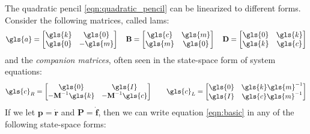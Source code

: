 \section{}
\label{sec:SPT}
The quadratic pencil \eqref{eqn:quadratic_pencil} can be linearized to different forms.
Consider the following matrices, called \glspl{lam}:
\begin{equation}
	\label{eqn:lam}
	\gls{a} = \begin{bmatrix}
	\gls{k} & \gls{0}\\
	\gls{0} & -\gls{m}
	\end{bmatrix} 
	\quad\mathbf{B} = \begin{bmatrix}
	\gls{c} & \gls{m}\\
	\gls{m} & \gls{0}
	\end{bmatrix}  
	\quad\mathbf{D} = \begin{bmatrix}
	\gls{0} & \gls{k}\\
	\gls{k} & \gls{c}
	\end{bmatrix}
\end{equation}
and the \emph{companion matrices}, often seen in the state-space form of system equations:
\begin{equation}
	\gls{c}_R = \begin{bmatrix}
	\gls{0} & \gls{I}\\
	\mathbf{-M}^{-1}\gls{k} & \mathbf{-M}^{-1}\gls{c}
	\end{bmatrix} 
	\qquad \gls{c}_L = \begin{bmatrix}
	\gls{0} & \gls{k}\gls{m}^{-1}\\
	\gls{I} & \gls{c}\gls{m}^{-1}
	\end{bmatrix}
\end{equation}
If we let $\mathbf{p} = \mathbf{\dot{r}}$ and $\mathbf{P} = \mathbf{\dot{f}}$, 
then we can write equation \eqref{eqn:basic} in any of the following state-space 
forms:
